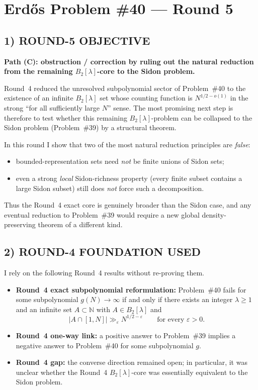 \section{Erd\H{o}s Problem \#40 --- Round 5}

\subsection*{1) ROUND-5 OBJECTIVE}
\textbf{Path (C): obstruction / correction by ruling out the natural reduction from the remaining $B_2[\lambda]$-core to the Sidon problem.}

Round~4 reduced the unresolved subpolynomial sector of Problem~\#40 to the existence of an
infinite $B_2[\lambda]$ set whose counting function is $N^{1/2-o(1)}$ in the strong
``for all sufficiently large $N$'' sense. The most promising next step is therefore to test
whether this remaining $B_2[\lambda]$-problem can be collapsed to the Sidon problem
(Problem~\#39) by a structural theorem.

In this round I show that two of the most natural reduction principles are \emph{false}:
\begin{itemize}
\item bounded-representation sets need \emph{not} be finite unions of Sidon sets;
\item even a strong \emph{local} Sidon-richness property (every finite subset contains a large
Sidon subset) still does \emph{not} force such a decomposition.
\end{itemize}
Thus the Round~4 exact core is genuinely broader than the Sidon case, and any eventual
reduction to Problem~\#39 would require a new global density-preserving theorem of a different kind.

\subsection*{2) ROUND-4 FOUNDATION USED}
I rely on the following Round~4 results without re-proving them.
\begin{itemize}
\item \textbf{Round~4 exact subpolynomial reformulation:} Problem~\#40 fails for some
subpolynomial $g(N)\to\infty$ if and only if there exists an integer $\lambda\ge 1$ and an
infinite set $A\subset\mathbb N$ with $A\in B_2[\lambda]$ and
\[
|A\cap[1,N]|\gg_{\varepsilon} N^{1/2-\varepsilon}
\qquad\text{for every }\varepsilon>0.
\]
\item \textbf{Round~4 one-way link:} a positive answer to Problem~\#39 implies a negative answer
to Problem~\#40 for some subpolynomial $g$.
\item \textbf{Round~4 gap:} the converse direction remained open; in particular, it was unclear
whether the Round~4 $B_2[\lambda]$-core was essentially equivalent to the Sidon problem.
\end{itemize}

